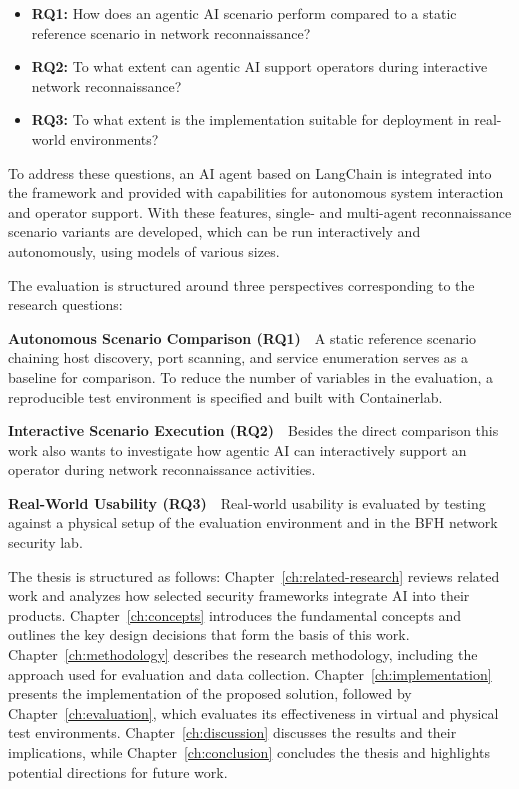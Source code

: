 \begin{itemize}
    \item \textbf{RQ1:}\label{rq1} How does an agentic \gls{AI} scenario perform compared to a static reference scenario in network reconnaissance?
    \item \textbf{RQ2:}\label{rq2} To what extent can agentic \gls{AI} support operators during interactive network reconnaissance?
    \item \textbf{RQ3:}\label{rq3} To what extent is the implementation suitable for deployment in real-world environments?
\end{itemize}

To address these questions, an \gls{AI} agent based on \gls{LangChain} is integrated into the framework and
provided with capabilities for autonomous system interaction and operator support.
With these features, single- and multi-agent reconnaissance scenario variants are developed,
which can be run interactively and autonomously, using models of various sizes.

The evaluation is structured around three perspectives corresponding to the research questions:

\textbf{Autonomous Scenario Comparison (RQ1)}~\textthreequartersemdash~A static reference scenario chaining host discovery, port scanning, and service enumeration serves as a baseline for comparison.
To reduce the number of variables in the evaluation, a reproducible test environment is specified and built with \gls{Containerlab}.

\textbf{Interactive Scenario Execution (RQ2)}~\textthreequartersemdash~Besides the direct comparison this work also wants to investigate how agentic \gls{AI} can interactively support an operator during network reconnaissance activities.

\textbf{Real-World Usability (RQ3)}~\textthreequartersemdash~Real-world usability is evaluated by testing against a physical setup of the evaluation environment and in the BFH network security lab.

The thesis is structured as follows:
Chapter~\ref{ch:related-research} reviews related work and analyzes how selected security frameworks integrate \gls{AI} into their products.
Chapter~\ref{ch:concepts} introduces the fundamental concepts and outlines the key design decisions that form the basis of this work.
Chapter~\ref{ch:methodology} describes the research methodology, including the approach used for evaluation and data collection.
Chapter~\ref{ch:implementation} presents the implementation of the proposed solution, followed by
Chapter~\ref{ch:evaluation}, which evaluates its effectiveness in virtual and physical test environments.
Chapter~\ref{ch:discussion} discusses the results and their implications, while
Chapter~\ref{ch:conclusion} concludes the thesis and highlights potential directions for future work.


